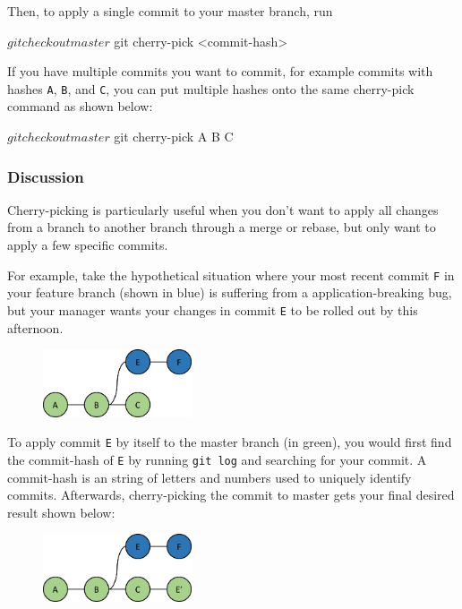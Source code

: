 \documentclass[12pt]{report}
\newcommand\code[1]{{\color{blue}\texttt{#1}}}
\begin{document}
Then, to apply a single commit to your master branch, run
\begin{blockcode}
$ git checkout master
$ git cherry-pick <commit-hash>
\end{blockcode}

If you have multiple commits you want to commit, for example commits with hashes \texttt{A}, \texttt{B}, and \texttt{C}, you can put multiple hashes onto the same cherry-pick command as shown below:
\begin{blockcode}
$ git checkout master
$ git cherry-pick A B C
\end{blockcode}

\subsubsection*{Discussion}

Cherry-picking is particularly useful when you don't want to apply all changes from a branch to another branch through a merge or rebase, but only want to apply a few specific commits.

For example, take the hypothetical situation where your most recent commit \texttt{F} in your feature branch (shown in blue) is suffering from a application-breaking bug, but your manager wants your changes in commit \texttt{E} to be rolled out by this afternoon.

\begin{figure}[h]
\center
\includegraphics[height=2cm]{feature.png}
\end{figure}

To apply commit \texttt{E} by itself to the master branch (in green), you would first find the commit-hash of \texttt{E} by running \code{git log} and searching for your commit.  A commit-hash is an string of letters and numbers used to uniquely identify commits.  Afterwards, cherry-picking the commit to master gets your final desired result shown below:

\begin{figure}[h]
\center
\includegraphics[height=2cm]{cherrypick.png}
\end{figure}
\end{document}
